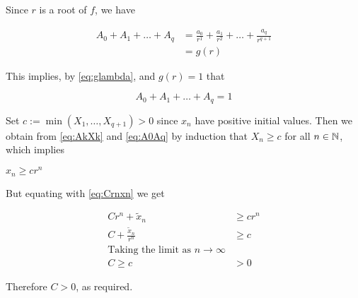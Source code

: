 \begin{theorem}
\begin{pf}
\begin{enumerate}[(a)]
Since $r$ is a root of $f$, we have

\begin{align}
  A_0+A_1+\dots+A_q &= \frac{a_0}{r^{1}}+\frac{a_1}{r^{2}}+\dots+\frac{a_q}{r^{q+1}} \nonumber \\ 
                     &= g(r) \nonumber 
\end{align}

This implies, by \eqref{eq:glambda}, and $g(r)=1$ that 

\begin{equation}
     A_0+A_1+\dots+A_q = 1 \label{eq:A0Aq}
\end{equation}

Set $c := \min(X_1, \dots , X_{q+1}) > 0$ since $x_n$ have positive initial values. Then we obtain from \eqref{eq:AkXk} and \eqref{eq:A0Aq} by induction that
$X_n \geq c$ for all $n \in \mathbb N$, which implies

$x_n\geq cr^n$

But equating with \eqref{eq:Crnxn} we get

\begin{align}
      Cr^n + \tilde{x}_n   &\geq cr^n  \nonumber\\
    C +\frac{\tilde{x}_n}{r^n}    &\geq c \nonumber \\
  \text{Taking the limit as } n\to\infty \nonumber \\
   C \geq c &> 0
\end{align}

Therefore $C>0$, as required.
\end{enumerate}
\end{pf}
\end{theorem}

